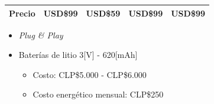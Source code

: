 \documentclass[mathserif]{beamer}
\begin{document}
\begin{frame}
\begin{table}
{\begin{tabular}{c||c|c|c|c|}
\multicolumn{1}{|c||}{\textbf{Precio}}                                                            & USD\$99                                                                                                           & USD\$59                                                              & USD\$99                                                                             & USD\$99                                                                                      \\ \hline
\end{tabular}
}
\end{table}

\begin{itemize}
\pause
\item \textit{Plug \& Play}
\pause
\item Baterías de litio 3[V] - 620[mAh]
\begin{itemize}
\pause
\item Costo: CLP\$5.000 - CLP\$6.000
\pause
\item Costo energético mensual: CLP\$250
\end{itemize}
\end{itemize}

\end{frame}

\end{document}
